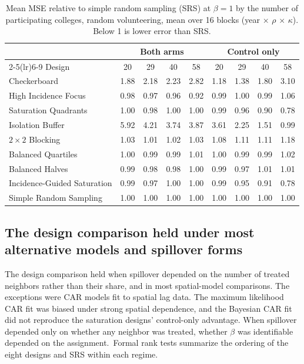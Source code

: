 \documentclass[11pt]{article}
\begin{document}
\begin{table}[!htb]
\small
\centering
\caption{Mean MSE relative to simple random sampling (SRS) at $\beta = 1$ by the number of participating colleges, random volunteering, mean over 16 blocks (year $\times$ $\rho$ $\times$ $\kappa$). Below 1 is lower error than SRS.}
\label{tab:nc-guidance}
\begin{tabular}{lcccccccc}
\toprule
& \multicolumn{4}{c}{Both arms} & \multicolumn{4}{c}{Control only} \\
\cmidrule(lr){2-5}\cmidrule(lr){6-9}
Design & 20 & 29 & 40 & 58 & 20 & 29 & 40 & 58 \\
\midrule
Checkerboard & 1.88 & 2.18 & 2.23 & 2.82 & 1.18 & 1.38 & 1.80 & 3.10 \\
High Incidence Focus & 0.98 & 0.97 & 0.96 & 0.92 & 0.99 & 1.00 & 0.99 & 1.06 \\
Saturation Quadrants & 1.00 & 0.98 & 1.00 & 1.00 & 0.99 & 0.96 & 0.90 & 0.78 \\
Isolation Buffer & 5.92 & 4.21 & 3.74 & 3.87 & 3.61 & 2.25 & 1.51 & 0.99 \\
$2\times2$ Blocking & 1.03 & 1.01 & 1.02 & 1.03 & 1.08 & 1.11 & 1.11 & 1.18 \\
Balanced Quartiles & 1.00 & 0.99 & 0.99 & 1.01 & 1.00 & 0.99 & 0.99 & 1.02 \\
Balanced Halves & 0.99 & 0.98 & 0.98 & 1.00 & 0.99 & 0.97 & 1.01 & 1.01 \\
Incidence-Guided Saturation & 0.99 & 0.97 & 1.00 & 1.00 & 0.99 & 0.95 & 0.91 & 0.78 \\
Simple Random Sampling & 1.00 & 1.00 & 1.00 & 1.00 & 1.00 & 1.00 & 1.00 & 1.00 \\
\bottomrule
\end{tabular}
\end{table}


\subsection{The design comparison held under most alternative models and spillover forms}\label{nc-sensitivity-results}


The design comparison held when spillover depended on the number of
treated neighbors rather than their share, and in most spatial-model
comparisons. The exceptions were CAR
models fit to spatial lag data. The maximum likelihood CAR fit was
biased under strong spatial dependence, and the Bayesian CAR fit did not
reproduce the saturation designs' control-only advantage. When spillover depended only on whether any neighbor was treated,
whether $\beta$ was identifiable depended on the assignment.\iffullsi\
Formal rank tests summarize the ordering of the eight designs and SRS
within each regime.\fi
\end{document}
